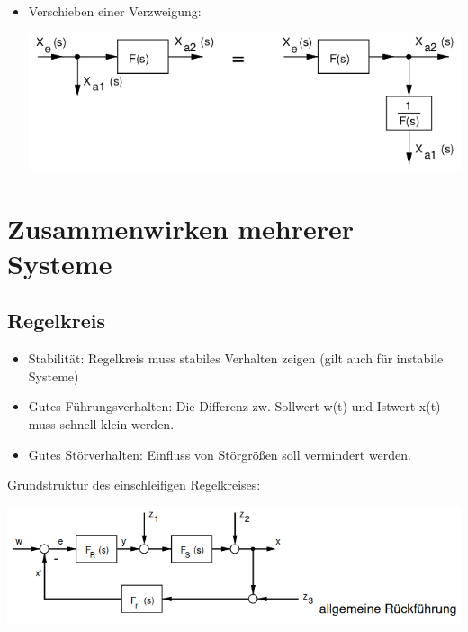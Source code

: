\documentclass[10pt,a4paper]{article}
\begin{document}
\begin{itemize}[leftmargin=*]
	\item Verschieben einer Verzweigung:
	      \begin{center}
		      \includegraphics[width=0.9\columnwidth]{Figures/Verschiebung einer Verzweigung.png}
	      \end{center}
\end{itemize}

\section{Zusammenwirken mehrerer Systeme}
\subsection{Regelkreis}
\begin{mdframed}[style=exercise,frametitle=Anforderungen:]
    \begin{itemize}[leftmargin=*]
		\item Stabilität: Regelkreis muss stabiles Verhalten zeigen (gilt
		      auch für instabile Systeme)
		\item Gutes Führungsverhalten: Die Differenz zw. Sollwert w(t) und
		      Istwert x(t) muss schnell klein werden.
		\item Gutes Störverhalten: Einfluss von Störgrößen soll vermindert
		      werden.
	\end{itemize}
\end{mdframed}

Grundstruktur des einschleifigen Regelkreises:

\includegraphics[width=0.9\columnwidth]{Figures/einschleifiger Regelkreis.png}
\end{document}
